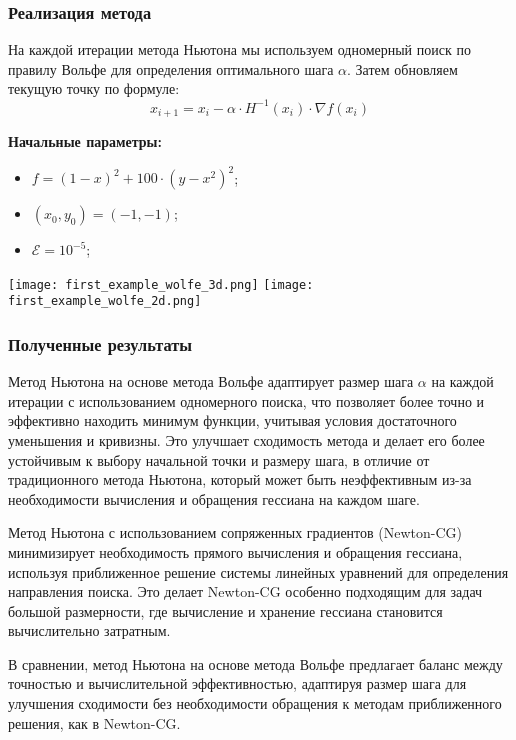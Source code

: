 \documentclass{article}
\begin{document}
\subsubsection*{Реализация метода}
На каждой итерации метода Ньютона мы используем одномерный поиск по правилу Вольфе для определения оптимального шага $\alpha$. Затем обновляем текущую точку по формуле:
\[x_{i+1} = x_i - \alpha \cdot H^{-1}(x_i) \cdot \nabla f(x_i)\]

\noindent \textbf{Начальные параметры:}
\begin{itemize}
    \item $f = (1 - x)^{2} + 100 \cdot (y - x^{2})^{2} $;
   \item $(x_0, y_0) = (-1, -1)$;
    \item $\mathcal{E} = 10^{-5}$;
\end{itemize}
\begin{center}
    \texttt{[image: first\_example\_wolfe\_3d.png]}
    \texttt{[image: first\_example\_wolfe\_2d.png]}
    \label{fig:enter-label}
\end{center}

\subsubsection*{Полученные результаты}

Метод Ньютона на основе метода Вольфе адаптирует размер шага $\alpha$ на каждой итерации с использованием одномерного поиска, что позволяет более точно и эффективно находить минимум функции, учитывая условия достаточного уменьшения и кривизны. Это улучшает сходимость метода и делает его более устойчивым к выбору начальной точки и размеру шага, в отличие от традиционного метода Ньютона, который может быть неэффективным из-за необходимости вычисления и обращения гессиана на каждом шаге.

\noindent Метод Ньютона с использованием сопряженных градиентов (Newton-CG) минимизирует необходимость прямого вычисления и обращения гессиана, используя приближенное решение системы линейных уравнений для определения направления поиска. Это делает Newton-CG особенно подходящим для задач большой размерности, где вычисление и хранение гессиана становится вычислительно затратным.

\noindent В сравнении, метод Ньютона на основе метода Вольфе предлагает баланс между точностью и вычислительной эффективностью, адаптируя размер шага для улучшения сходимости без необходимости обращения к методам приближенного решения, как в Newton-CG.
\end{document}

